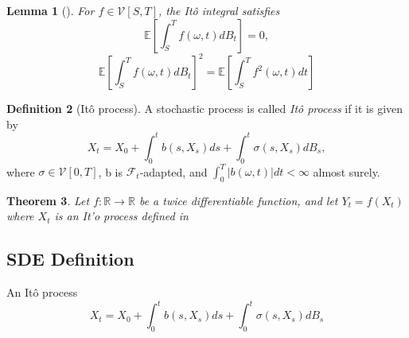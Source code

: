 \documentclass[12pt]{article}
\newtheorem{theorem}{Theorem}[section]
\newtheorem{lemma}[theorem]{Lemma}
\theoremstyle{definition}
\newtheorem{definition}[theorem]{Definition}
\numberwithin{equation}{section}
\newcommand{\R}{\mathbb{R}}
\newcommand{\E}{\mathbb{E}}
\newcommand{\CF}{\mathcal{F}}
\newcommand{\CV}{\mathcal{V}}
\begin{document}
\begin{lemma}[\autocite{eAppliedStochasticAnalysis2021}]
  For $f \in \CV[S,T]$, the Itô integral satisfies
  \begin{equation}
    \E \left[ \int_S^T f(\omega,t)dB_t \right] = 0,
  \end{equation}
  \begin{equation}
    \E \left[ \int_S^T f(\omega,t)dB_t \right]^2 = \E \left[ \int_S^T f^2(\omega,t)dt \right]
  \end{equation}
\end{lemma}
\begin{definition}[Itô process]
  A stochastic process is called \emph{Itô process} if it is given by
  \begin{equation}
    X_t = X_0 + \int_0^tb(s, X_s)ds + \int_0^t \sigma(s, X_s)dB_s,
  \end{equation}
  where $\sigma \in \CV[0,T]$, b is $\CF_t$-adapted, and $\int_0^T |b(\omega,t)|dt < \infty$ almost surely.
\end{definition}
\begin{theorem}
  Let $f : \R \rightarrow \R$ be a twice differentiable function, and let $Y_t = f(X_t)$ where $X_t$ is an It'o process defined in 
\end{theorem}
\subsection{SDE Definition}
\label{subsec:SDEDefinition}

An Itô process 
\begin{equation}
  X_t = X_0 + \int_0^tb(s, X_s)ds + \int_0^t \sigma(s, X_s)dB_s
\end{equation}
\end{document}
